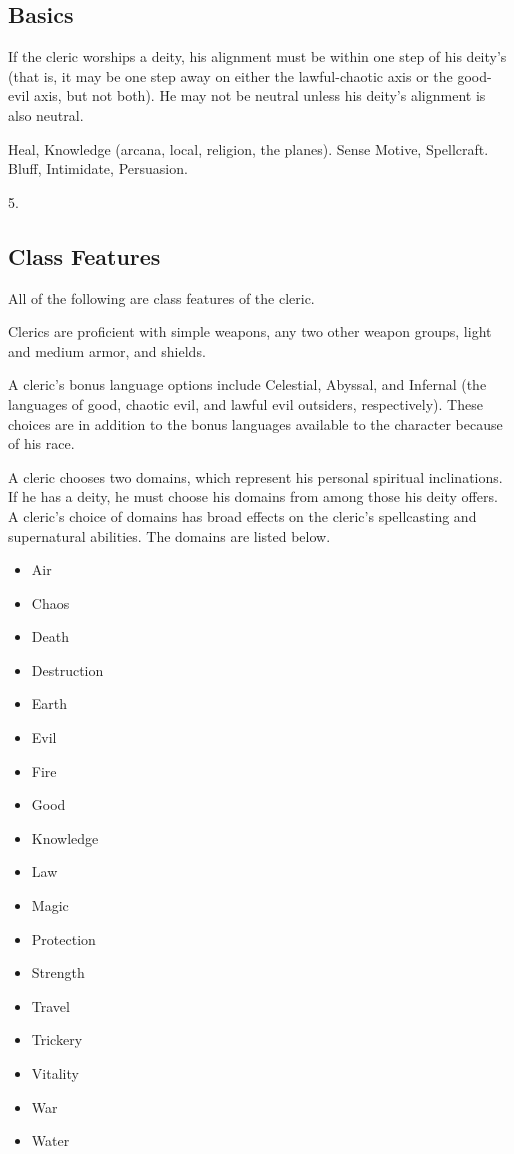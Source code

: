 \subsection{Basics}

 If the cleric worships a deity, his alignment must be within one step of his deity's (that is, it may be one step away on either the lawful-chaotic axis or the good-evil axis, but not both).
He may not be neutral unless his deity's alignment is also neutral.

 Heal, Knowledge (arcana, local, religion, the planes).
 Sense Motive, Spellcraft.
 Bluff, Intimidate, Persuasion.

 5.

\subsection{Class Features}
All of the following are class features of the cleric.

 Clerics are proficient with simple weapons, any two other weapon groups, light and medium armor, and shields.

A cleric's bonus language options include Celestial, Abyssal, and Infernal (the languages of good, chaotic evil, and lawful evil outsiders, respectively).
These choices are in addition to the bonus languages available to the character because of his race.

A cleric chooses two domains, which represent his personal spiritual inclinations.
If he has a deity, he must choose his domains from among those his deity offers.
A cleric's choice of domains has broad effects on the cleric's spellcasting and supernatural abilities.
The domains are listed below.

\begin{itemize}
    \item{Air} 
    \item{Chaos}
    \item{Death}
    \item{Destruction} 
    \item{Earth}
    \item{Evil}
    \item{Fire}
    \item{Good}
    \item{Knowledge}
    \item{Law}
    \item{Magic}
    \item{Protection}
    \item{Strength}
    \item{Travel}
    \item{Trickery}
    \item{Vitality}
    \item{War}
    \item{Water}
\end{itemize}

